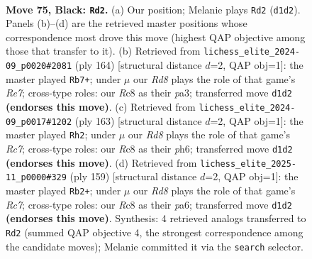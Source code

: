 \documentclass[11pt]{article}
\begin{document}
\clearpage

\begin{figure}[p]\centering
\begin{subfigure}{0.46\textwidth}\centering
\resizebox{\linewidth}{!}{%
\newchessgame
\chessboard[
  setfen={2r5/1R6/7k/8/5K2/8/7P/3r4 b - - 18 75},
  showmover=false,
  pgfstyle=straightmove, color=movearrow, markmove={d1-d2}
]}
\caption{}
\end{subfigure}\hfill
\begin{subfigure}{0.46\textwidth}\centering
\resizebox{\linewidth}{!}{%
\newchessgame
\chessboard[
  setfen={2r5/4R3/8/8/8/p2K4/8/1k6 w - - 2 83},
  showmover=false,
  pgfstyle=straightmove, color=movearrow, markmove={e7-b7}
]}
\caption{}
\end{subfigure}
\\[4pt]
\begin{subfigure}{0.46\textwidth}\centering
\resizebox{\linewidth}{!}{%
\newchessgame
\chessboard[
  setfen={3k4/8/7P/5K2/8/8/2r5/4R3 b - - 0 82},
  showmover=false,
  pgfstyle=straightmove, color=movearrow, markmove={c2-h2}
]}
\caption{}
\end{subfigure}\hfill
\begin{subfigure}{0.46\textwidth}\centering
\resizebox{\linewidth}{!}{%
\newchessgame
\chessboard[
  setfen={1K6/4k3/P7/8/8/8/2r5/3R4 b - - 8 80},
  showmover=false,
  pgfstyle=straightmove, color=movearrow, markmove={c2-b2}
]}
\caption{}
\end{subfigure}
\caption{\textbf{Move 75, Black: \texttt{Rd2}.} (a) Our position; Melanie plays \texttt{Rd2} (\texttt{d1d2}). Panels (b)--(d) are the retrieved master positions whose correspondence most drove this move (highest QAP objective among those that transfer to it). (b) Retrieved from \texttt{lichess\_elite\_2024-09\_p0020\#2081} (ply 164) [structural distance $d$=2, QAP obj=1]: the master played \texttt{Rb7+}; under $\mu$ our \emph{Rd8} plays the role of that game's \emph{Re7}; cross-type roles: our \emph{R}c8 as their \emph{p}a3; transferred move \texttt{d1d2} \textbf{(endorses this move)}. (c) Retrieved from \texttt{lichess\_elite\_2024-09\_p0017\#1202} (ply 163) [structural distance $d$=2, QAP obj=1]: the master played \texttt{Rh2}; under $\mu$ our \emph{Rd8} plays the role of that game's \emph{Rc7}; cross-type roles: our \emph{R}c8 as their \emph{p}h6; transferred move \texttt{d1d2} \textbf{(endorses this move)}. (d) Retrieved from \texttt{lichess\_elite\_2025-11\_p0000\#329} (ply 159) [structural distance $d$=2, QAP obj=1]: the master played \texttt{Rb2+}; under $\mu$ our \emph{Rd8} plays the role of that game's \emph{Rc7}; cross-type roles: our \emph{R}c8 as their \emph{p}a6; transferred move \texttt{d1d2} \textbf{(endorses this move)}. Synthesis: 4 retrieved analogs transferred to \texttt{Rd2} (summed QAP objective 4, the strongest correspondence among the candidate moves); Melanie committed it via the \texttt{search} selector.}
\label{fig:thought-m149}
\end{figure}
\end{document}
